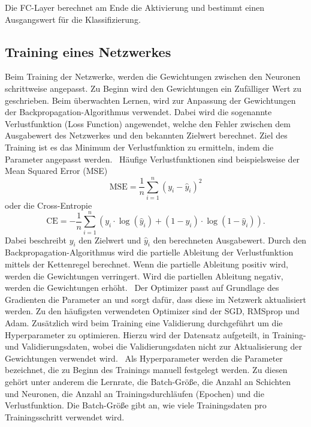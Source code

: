 Die FC-Layer berechnet am Ende die Aktivierung und bestimmt einen Ausgangswert für die Klassifizierung.
\subsection{Training eines Netzwerkes}

Beim Training der Netzwerke, werden die Gewichtungen zwischen den Neuronen schrittweise angepasst. 
Zu Beginn wird den Gewichtungen ein Zufälliger Wert zu geschrieben.
Beim überwachten Lernen, wird zur Anpassung der Gewichtungen der Backpropagation-Algorithmus verwendet.
Dabei wird die sogenannte Verlustfunktion (Loss Function) angewendet, welche den Fehler zwischen dem Ausgabewert des Netzwerkes und den bekannten Zielwert berechnet.
Ziel des Training ist es das Minimum der Verlustfunktion zu ermitteln, indem die Parameter angepasst werden.~\cite{datascience}
Häufige Verlustfunktionen sind beispielsweise der Mean Squared Error (MSE)
\begin{equation}
  \text{MSE}  =  \frac{1}{n} \sum_{i=1}^{n} (y_i - \hat{y}_i)^2
\end{equation}
oder die Cross-Entropie  
\begin{equation}
\text{CE} = -\frac{1}{n} \sum_{i=1}^{n} \left( y_i \cdot \log(\hat{y}_i) + (1 - y_i) \cdot \log(1 - \hat{y}_i) \right).
\end{equation}
Dabei beschreibt $y_i$ den Zielwert und $\hat{y}_i$ den berechneten Ausgabewert.
Durch den Backpropagation-Algorithmus wird die partielle Ableitung der Verlustfunktion mittels der Kettenregel berechnet.
Wenn die partielle Ableitung positiv wird, werden die Gewichtungen verringert. 
Wird die partiellen Ableitung negativ, werden die Gewichtungen erhöht.~\cite{neuralnet}
Der Optimizer passt auf Grundlage des Gradienten die Parameter an und sorgt dafür, dass diese im Netzwerk aktualisiert werden.
Zu den häufigsten verwendeten Optimizer sind der SGD, RMSprop und Adam.
Zusätzlich wird beim Training eine Validierung durchgeführt um die Hyperparameter zu optimieren. 
Hierzu wird der Datensatz aufgeteilt, in Training- und Validierungsdaten, wobei die Validierungsdaten nicht zur Aktualisierung 
der Gewichtungen verwendet wird.~\cite{Yamashita2018}
Als Hyperparameter werden die Parameter bezeichnet, die zu Beginn des Trainings manuell festgelegt werden.
Zu diesen gehört unter anderem die Lernrate, die Batch-Größe, die Anzahl an Schichten und Neuronen, die Anzahl an Trainingsdurchläufen (Epochen)
und die Verlustfunktion.
Die Batch-Größe gibt an, wie viele Trainingsdaten pro Trainingsschritt verwendet wird.~\cite{datascience} 

